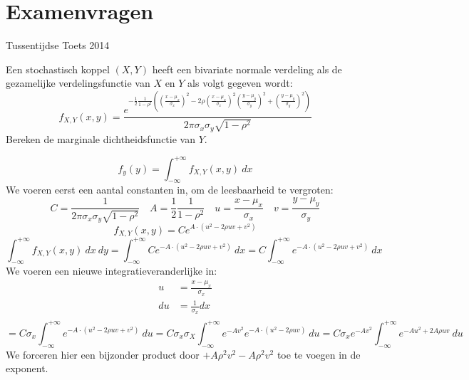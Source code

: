 \documentclass[main.tex]{subfiles}
\begin{document}
\chapter{Examenvragen}
\label{cha:examenvragen}

\begin{examenvraag}{Tussentijdse Toets 2014}
  \begin{ex-vraag}
    Een stochastisch koppel $(X,Y)$ heeft een bivariate normale verdeling als de gezamelijke verdelingsfunctie van $X$ en $Y$ als volgt gegeven wordt:
    \[
    f_{X,Y}(x,y)
    =
    \frac
    {
      e^{-\frac{1}{2}\frac{1}{1-\rho^{2}}
        \left(
          \left(\frac{x-\mu_{x}}{\sigma_{x}}\right)^{2}
          - 2\rho\left(\frac{x-\mu_{x}}{\sigma_{x}}\right)^{2}\left(\frac{y-\mu_{y}}{\sigma_{y}}\right)^{2}
          + \left(\frac{y-\mu_{y}}{\sigma_{y}}\right)^{2}
        \right)
      }
    }
    {
      2\pi\sigma_{x}\sigma_{y}\sqrt{1-\rho^{2}}
    }
    \]
    Bereken de marginale dichtheidsfunctie van $Y$.
  \end{ex-vraag}
  \begin{ex-antwoord}
    \[ f_{y}(y) = \int_{-\infty}^{+\infty}f_{X,Y}(x,y)\ dx \]
    We voeren eerst een aantal constanten in, om de leesbaarheid te vergroten:
    \[ 
    C = \dfrac{1}{2\pi\sigma_{x}\sigma_{y}\sqrt{1-\rho^{2}}} \quad A = \frac{1}{2}\frac{1}{1-\rho^{2}} \quad u = \frac{x-\mu_{x}}{\sigma_{x}} \quad v = \frac{y-\mu_{y}}{\sigma_{y}}
    \]
    \[ f_{X,Y}(x,y) = C e^{A \cdot (u^{2}-2\rho u v + v^{2})} \]
    \[ \int_{-\infty}^{+\infty}f_{X,Y}(x,y)\ dx\ dy = \int_{-\infty}^{+\infty} C e^{-A \cdot (u^{2}-2\rho u v + v^{2})}\ dx = C\int_{-\infty}^{+\infty}e^{-A \cdot (u^{2}-2\rho u v + v^{2})}\ dx \]
    We voeren een nieuwe integratieveranderlijke in:
    \[ 
    \begin{array}{rl}
      u &= \frac{x-\mu_{x}}{\sigma_{x}}\\
      du &= \frac{1}{\sigma_{x}}dx\\
    \end{array}
    \]
    \[
    = C\sigma_{x}\int_{-\infty}^{+\infty}e^{-A \cdot (u^{2}-2\rho u v + v^{2})}\ du
    = C\sigma_{x}\sigma_{X}\int_{-\infty}^{+\infty}e^{-Av^{2}}e^{-A \cdot (u^{2}-2\rho u v)}\ du
    = C\sigma_{x}e^{-Av^{2}}\int_{-\infty}^{+\infty}e^{-Au^{2}+2A\rho u v}\ du
    \]
    We forceren hier een bijzonder product door $+ A\rho^{2}v^{2} - A\rho^{2}v^{2}$ toe te voegen in de exponent.
    \[
\]
\end{ex-antwoord}
\end{examenvraag}
\end{document}

